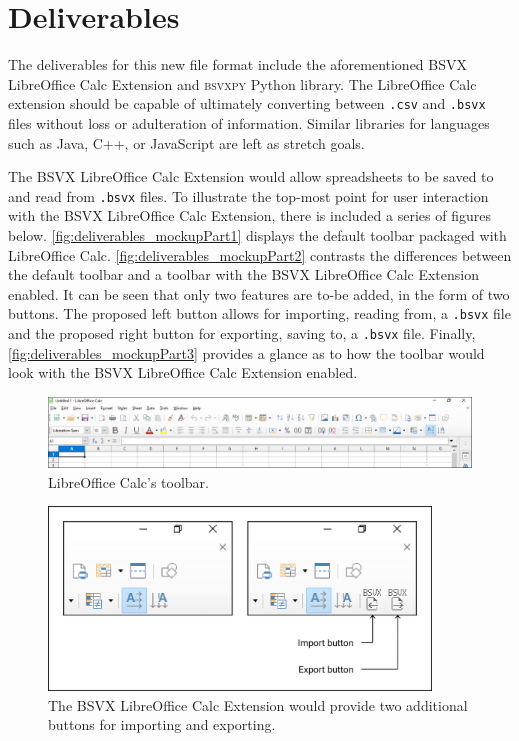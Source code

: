 \documentclass[10pt]{article}
\begin{document}
\section*{Deliverables}

The deliverables for this new file format include the aforementioned BSVX LibreOffice Calc Extension and \textsc{bsvxpy} Python library.
The LibreOffice Calc extension should be capable of ultimately converting between \texttt{.csv} and \texttt{.bsvx} files without loss or adulteration of information.
Similar libraries for languages such as Java, C++, or JavaScript are left as stretch goals.

\indent{}
The BSVX LibreOffice Calc Extension would allow spreadsheets to be saved to and read from \texttt{.bsvx} files.
To illustrate the top-most point for user interaction with the BSVX LibreOffice Calc Extension, there is included a series of figures below. 
\autoref{fig:deliverables_mockupPart1} displays the default toolbar packaged with LibreOffice Calc.
\autoref{fig:deliverables_mockupPart2} contrasts the differences between the default toolbar and a toolbar with the BSVX LibreOffice Calc Extension enabled.
It can be seen that only two features are to-be added, in the form of two buttons.
The proposed left button allows for importing, reading from, a \texttt{.bsvx} file and the proposed right button for exporting, saving to, a \texttt{.bsvx} file.
Finally, \autoref{fig:deliverables_mockupPart3} provides a glance as to how the toolbar would look with the BSVX LibreOffice Calc Extension enabled.

\begin{figure}[H]
\centering
\includegraphics[width=\textwidth]{figures/mockupPart1.png}
\caption{LibreOffice Calc's toolbar.}
\label{fig:deliverables_mockupPart1}
\end{figure}

\begin{figure}[H]
\centering
\includegraphics[width=4in]{figures/mockupPart2.png}
\caption{The BSVX LibreOffice Calc Extension would provide two additional buttons for importing and exporting.}
\label{fig:deliverables_mockupPart2}
\end{figure}
\end{document}
